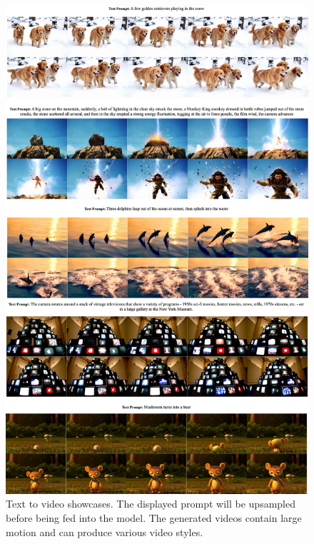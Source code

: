 \begin{figure}[ht]
\begin{center}
\includegraphics[width=\linewidth]{images/t2v/goodcase1.jpg}
\end{center}
\caption{Text to video showcases. The displayed prompt will be upsampled before being fed into the model. The generated videos contain large motion and can produce various video styles.}
\label{fig:t2vgood1}
\end{figure}

